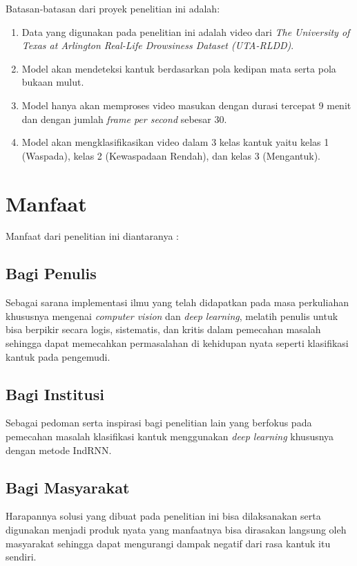 Batasan-batasan dari proyek penelitian ini adalah:

\begin{enumerate}[nolistsep]

      \item Data yang digunakan pada penelitian ini adalah video
            dari \emph{The University of Texas at Arlington Real-Life Drowsiness Dataset (UTA-RLDD)}.

      \item Model akan mendeteksi kantuk berdasarkan pola kedipan
            mata serta pola bukaan mulut.

      \item Model hanya akan memproses video masukan dengan durasi
            tercepat 9 menit dan dengan jumlah \emph{frame per second}
            sebesar 30.

      \item Model akan mengklasifikasikan video dalam 3 kelas kantuk
            yaitu kelas 1 (Waspada), kelas 2 (Kewaspadaan Rendah),
            dan kelas 3 (Mengantuk).

\end{enumerate}

\section{Manfaat}

Manfaat dari penelitian ini diantaranya :
\subsection{Bagi Penulis}
Sebagai sarana implementasi ilmu yang telah didapatkan pada masa
perkuliahan khususnya mengenai \emph{computer vision} dan \emph{deep learning}, melatih penulis untuk bisa
berpikir secara logis, sistematis, dan kritis dalam pemecahan masalah sehingga dapat
memecahkan permasalahan di kehidupan nyata seperti klasifikasi kantuk pada pengemudi.
\subsection{Bagi Institusi}
Sebagai pedoman serta inspirasi bagi penelitian lain yang
berfokus pada pemecahan masalah klasifikasi kantuk menggunakan \emph{deep learning} khususnya dengan
metode IndRNN.
\subsection{Bagi Masyarakat}
Harapannya solusi yang dibuat pada penelitian ini bisa dilaksanakan serta digunakan
menjadi produk nyata yang manfaatnya bisa dirasakan langsung oleh masyarakat sehingga dapat
mengurangi dampak negatif dari rasa kantuk itu sendiri.
